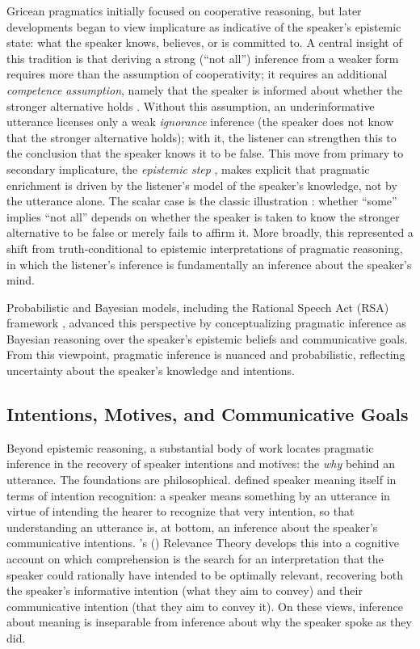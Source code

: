 \documentclass[12pt,a4paper]{article}
\begin{document}
Gricean pragmatics initially focused on cooperative reasoning, but later
developments began to view implicature as indicative of the speaker's epistemic
state: what the speaker knows, believes, or is committed to. A central insight of
this tradition is that deriving a strong (``not all'') inference from a weaker
form requires more than the assumption of cooperativity; it requires an
additional \emph{competence assumption}, namely that the speaker is informed
about whether the stronger alternative holds \citep{sauerland2004,schulzvanrooij2006,geurts2010}.
Without this assumption, an underinformative utterance licenses only a weak
\emph{ignorance} inference (the speaker does not know that the stronger
alternative holds); with it, the listener can strengthen this to the conclusion
that the speaker knows it to be false. This move from primary to secondary
implicature, the \emph{epistemic step} \citep{sauerland2004,BrehenyKatsosWilliams2006},
makes explicit that pragmatic enrichment is driven by the listener's model of the
speaker's knowledge, not by the utterance alone. The scalar case is the classic
illustration \citep{Spector2007,ChemlaSingh2014a}: whether ``some'' implies ``not
all'' depends on whether the speaker is taken to know the stronger alternative to
be false or merely fails to affirm it. More broadly, this represented a shift from
truth-conditional to epistemic interpretations of pragmatic reasoning, in which
the listener's inference is fundamentally an inference about the speaker's mind.

Probabilistic and Bayesian
models, including the Rational Speech Act (RSA) framework
\citep{frank2012,GoodmanStuhlmuller2013,PottsLassiterLevyFrank2016}, advanced
this perspective by conceptualizing pragmatic inference as Bayesian reasoning
over the speaker's epistemic beliefs and communicative goals. From this
viewpoint, pragmatic inference is nuanced and probabilistic, reflecting
uncertainty about the speaker's knowledge and intentions.

\subsection{Intentions, Motives, and Communicative Goals}

Beyond epistemic reasoning, a substantial body of work locates pragmatic
inference in the recovery of speaker intentions and motives: the \emph{why}
behind an utterance. The foundations are philosophical. \citet{Grice1957} defined
speaker meaning itself in terms of intention recognition: a speaker means
something by an utterance in virtue of intending the hearer to recognize that
very intention, so that understanding an utterance is, at bottom, an inference
about the speaker's communicative intentions. \citeauthor{SperberWilson1995}'s
(\citeyear{SperberWilson1995}) Relevance Theory develops this into a cognitive
account on which comprehension is the search for an interpretation that the
speaker could rationally have intended to be optimally relevant, recovering both
the speaker's informative intention (what they aim to convey) and their
communicative intention (that they aim to convey it). On these views, inference
about meaning is inseparable from inference about why the speaker spoke as they
did.
\end{document}
